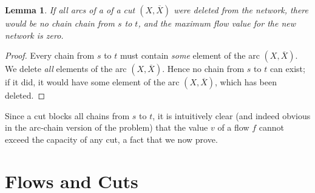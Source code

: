 \documentclass[titlepage]{article}
\newcommand{\Xbar}{\ensuremath{\overline{X}}}
\theoremstyle{plain}
\newtheorem{lemma}{Lemma}[theorem]
\theoremstyle{definition}
\theoremstyle{remark}
\begin{document}
\begin{lemma}
    If all arcs of a of a cut $(X, \Xbar)$ were deleted from the network, there would be no
    chain chain from $s$ to $t$, and the maximum flow value for the new network
    is zero.
\end{lemma}
\begin{proof}
    Every chain from $s$ to $t$ must contain \emph{some} element of the
    arc $(X, \Xbar)$. We delete \emph{all} elements of the arc $(X, \Xbar)$.
    Hence no chain from $s$ to $t$ can exist; if it did, it would have some
    element of the arc $(X, \Xbar)$, which has been deleted.
\end{proof}

Since a cut blocks all chains from $s$ to $t$, it is intuitively clear
(and indeed obvious in the arc-chain version of the problem) that the value
$v$ of a flow $f$ cannot exceed the capacity of any cut, a fact that
we now prove.

\section{Flows and Cuts}
\end{document}
